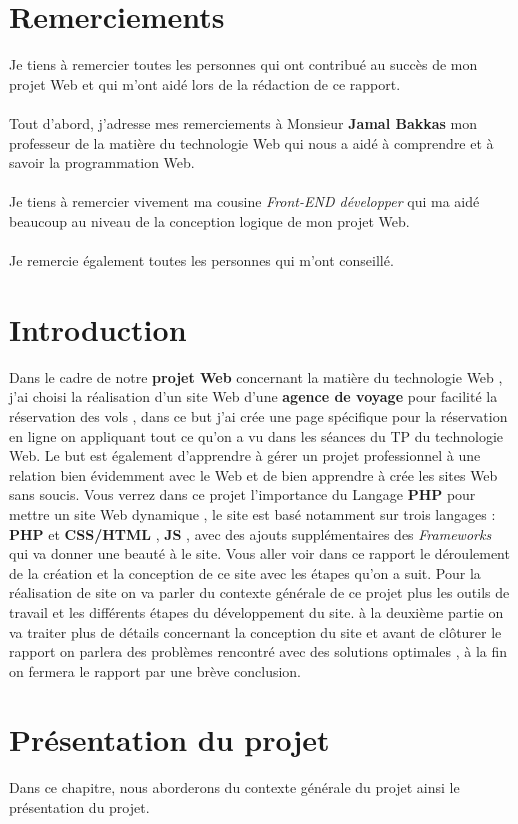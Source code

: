 \documentclass[a4paper,12pt]{report}
\begin{document}
\chapter*{Remerciements}
Je tiens à remercier toutes les personnes qui ont contribué au succès de mon projet Web et qui m'ont aidé lors de la rédaction de ce rapport.
\\
\\
Tout d'abord, j'adresse mes remerciements à Monsieur \textbf{Jamal Bakkas} mon professeur de la matière du technologie Web qui nous a aidé à comprendre et à savoir la programmation Web. 
\\
\\
Je tiens à remercier vivement ma cousine \textit{Front-END développer} qui ma aidé beaucoup au niveau de la conception logique de mon projet Web.
\\
\\
Je remercie également toutes les personnes qui m'ont conseillé. 
\tableofcontents
\listoffigures
\newpage
\chapter{Introduction} 
Dans le cadre de notre \textbf{projet Web} concernant la matière du technologie Web , j'ai choisi la réalisation d'un site Web d'une \textbf{agence de voyage} pour facilité la réservation des vols , dans ce but j'ai crée une page spécifique pour la réservation en ligne on appliquant tout ce qu'on a vu dans les séances du TP du technologie Web.
Le but est également d'apprendre à gérer un projet professionnel à une relation bien évidemment avec le Web et de bien apprendre à crée les sites Web sans soucis.
Vous verrez dans ce projet l'importance du Langage \textbf{PHP} pour mettre un site Web dynamique , le site est basé notamment sur trois langages : \textbf{PHP} et \textbf{CSS/HTML} , \textbf{JS} , avec des ajouts supplémentaires des \textit{Frameworks} qui va donner une beauté à le site.
Vous aller voir dans ce rapport le déroulement de la création et la conception de ce site avec les étapes qu'on a suit.
Pour la réalisation de site on va parler du contexte générale de ce projet plus les outils de travail et les différents étapes du développement du site.
à la deuxième partie on va traiter plus de détails concernant la conception du site et avant de clôturer le rapport on parlera des problèmes rencontré avec des solutions optimales , à la fin on fermera le rapport par une brève conclusion.
\chapter{Présentation du projet}
Dans ce chapitre, nous aborderons du contexte générale du projet ainsi le présentation du projet.
\end{document}
